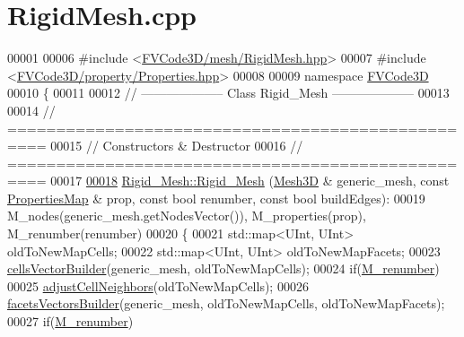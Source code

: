 \hypertarget{RigidMesh_8cpp_source}{}\section{Rigid\+Mesh.\+cpp}
\label{RigidMesh_8cpp_source}

\begin{DoxyCode}
00001 
00006 \textcolor{preprocessor}{#include <\hyperlink{RigidMesh_8hpp}{FVCode3D/mesh/RigidMesh.hpp}>}
00007 \textcolor{preprocessor}{#include <\hyperlink{Properties_8hpp}{FVCode3D/property/Properties.hpp}>}
00008 
00009 \textcolor{keyword}{namespace }\hyperlink{namespaceFVCode3D}{FVCode3D}
00010 \{
00011 
00012 \textcolor{comment}{// --------------------   Class Rigid\_Mesh   --------------------}
00013 
00014 \textcolor{comment}{// ==================================================}
00015 \textcolor{comment}{// Constructors & Destructor}
00016 \textcolor{comment}{// ==================================================}
00017 
\hypertarget{RigidMesh_8cpp_source.tex_l00018}{}\hyperlink{classFVCode3D_1_1Rigid__Mesh_a711f71a2f30f71f108264dee2be9a09a}{00018} \hyperlink{classFVCode3D_1_1Rigid__Mesh_a46bc8bc78b842c5cba9bc8f93e68de8a}{Rigid\_Mesh::Rigid\_Mesh} (\hyperlink{classFVCode3D_1_1Mesh3D}{Mesh3D} & generic\_mesh, \textcolor{keyword}{const} 
      \hyperlink{classFVCode3D_1_1PropertiesMap}{PropertiesMap} & prop, \textcolor{keyword}{const} \textcolor{keywordtype}{bool} renumber, \textcolor{keyword}{const} \textcolor{keywordtype}{bool} buildEdges):
00019     M\_nodes(generic\_mesh.getNodesVector()), M\_properties(prop), M\_renumber(renumber)
00020 \{
00021     std::map<UInt, UInt> oldToNewMapCells;
00022     std::map<UInt, UInt> oldToNewMapFacets;
00023     \hyperlink{classFVCode3D_1_1Rigid__Mesh_a3ddbd3589db60840edbbd76d4a69ec0a}{cellsVectorBuilder}(generic\_mesh, oldToNewMapCells);
00024     \textcolor{keywordflow}{if}(\hyperlink{classFVCode3D_1_1Rigid__Mesh_a3d9468c34407de926f494d4aa47af64f}{M\_renumber})
00025         \hyperlink{classFVCode3D_1_1Rigid__Mesh_a137e1a9da5d7fadfac8053c15ff4749b}{adjustCellNeighbors}(oldToNewMapCells);
00026     \hyperlink{classFVCode3D_1_1Rigid__Mesh_aa425c5b71169c77ee04ad9fe3ebf9123}{facetsVectorsBuilder}(generic\_mesh, oldToNewMapCells, oldToNewMapFacets);
00027     \textcolor{keywordflow}{if}(\hyperlink{classFVCode3D_1_1Rigid__Mesh_a3d9468c34407de926f494d4aa47af64f}{M\_renumber})

\end{DoxyCode}
